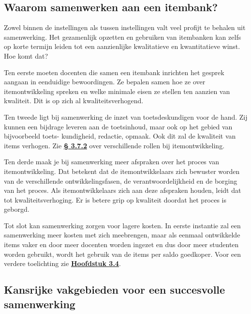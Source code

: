 \documentclass[
]{book}
\begin{document}
\hypertarget{waarom-samenwerken-aan-een-itembank-1}{%
\subsection{Waarom samenwerken aan een itembank?}\label{waarom-samenwerken-aan-een-itembank-1}}

Zowel binnen de instellingen als tussen instellingen valt veel profijt te behalen uit samenwerking. Het gezamenlijk opzetten en gebruiken van itembanken kan zelfs op korte termijn leiden tot een aanzienlijke kwalitatieve en kwantitatieve winst. Hoe komt dat?

Ten eerste moeten docenten die samen een itembank inrichten het gesprek aangaan in eenduidige bewoordingen. Ze bepalen samen hoe ze over itemontwikkeling spreken en welke minimale eisen ze stellen ten aanzien van kwaliteit. Dit is op zich al kwaliteitsverhogend.

Ten tweede ligt bij samenwerking de inzet van toetsdeskundigen voor de hand. Zij kunnen een bijdrage leveren aan de toetsinhoud, maar ook op het gebied van bijvoorbeeld toets- kundigheid, redactie, opmaak. Ook dit zal de kwaliteit van items verhogen. Zie \textbf{\protect\hyperlink{hoe-realiseer-je-een-kwaliteitsverbetering}{§ 3.7.2}} over verschillende rollen bij itemontwikkeling.

Ten derde maak je bij samenwerking meer afspraken over het proces van itemontwikkeling. Dat betekent dat de itemontwikkelaars zich bewuster worden van de verschillende ontwikkelingsfasen, de verantwoordelijkheid en de borging van het proces. Als itemontwikkelaars zich aan deze afspraken houden, leidt dat tot kwaliteitsverhoging. Er is betere grip op kwaliteit doordat het proces is geborgd.

Tot slot kan samenwerking zorgen voor lagere kosten. In eerste instantie zal een samenwerking meer kosten met zich meebrengen, maar als eenmaal ontwikkelde items vaker en door meer docenten worden ingezet en dus door meer studenten worden gebruikt, wordt het gebruik van de items per saldo goedkoper. Voor een verdere toelichting zie \textbf{\protect\hyperlink{kosten-en-baten}{Hoofdstuk 3.4}}.

\hypertarget{kansrijke-vakgebieden-voor-een-succesvolle-samenwerking}{%
\subsection{Kansrijke vakgebieden voor een succesvolle samenwerking}\label{kansrijke-vakgebieden-voor-een-succesvolle-samenwerking}}
\end{document}

